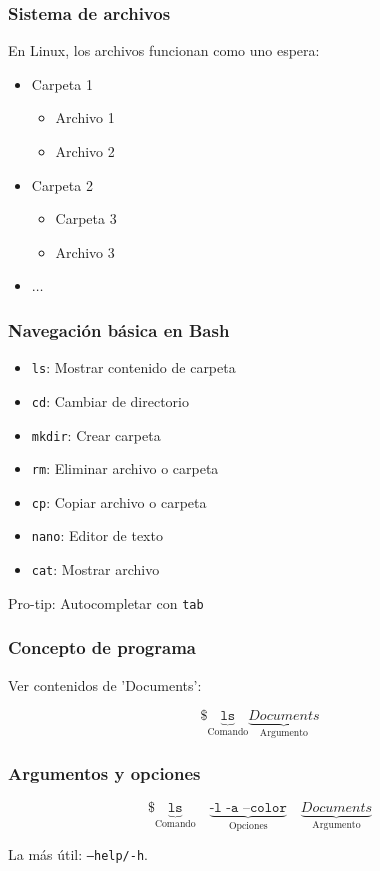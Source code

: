 \documentclass[14pt,aspectratio=169,xcolor=dvipsnames]{beamer}
\begin{document}
\begin{frame}\frametitle{Sistema de archivos}
En Linux, los archivos funcionan como uno espera:
    \begin{itemize}
        \item Carpeta 1
            \begin{itemize}
                \item Archivo 1
                \item Archivo 2
            \end{itemize}
        \item Carpeta 2
            \begin{itemize}
                \item Carpeta 3
                \item Archivo 3
            \end{itemize}
        \item $\dots$
    \end{itemize}

\end{frame}
\begin{frame}\frametitle{Navegación básica en Bash}
    \begin{itemize}
        \item \texttt{ls}: Mostrar contenido de carpeta
        \item \texttt{cd}: Cambiar de directorio
        \item \texttt{mkdir}: Crear carpeta
        \item \texttt{rm}: Eliminar archivo o carpeta
        \item \texttt{cp}: Copiar archivo o carpeta
        \item \texttt{nano}: Editor de texto
        \item \texttt{cat}: Mostrar archivo
    \end{itemize}

\vspace{1cm} 
Pro-tip: Autocompletar con \texttt{tab}
\end{frame}
\begin{frame}[fragile]\frametitle{Concepto de programa}
Ver contenidos de 'Documents':

    $$ \texttt{\$ }\underbrace{\texttt{ls}}_\text{Comando}  \underbrace{Documents}_\text{Argumento} $$
\end{frame}
\begin{frame}\frametitle{Argumentos y opciones}
    
    $$ \texttt{\$ }\underbrace{\texttt{ls}}_\text{Comando} \quad \underbrace{\texttt{-l -a --color}}_\text{Opciones} \quad \underbrace{Documents}_\text{Argumento} $$

La más útil: \texttt{--help/-h}. 

\vspace{1cm}
\end{frame}
\end{document}
